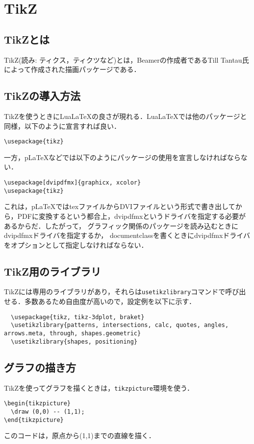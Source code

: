 \section{TikZ}
\subsection{TikZとは}
TikZ(読み: ティクス，ティクツなど)とは，Beamerの作成者であるTill Tantau氏によって作成された描画パッケージである．
\subsection{TikZの導入方法}
TikZを使うときにLuaLaTeXの良さが現れる．LuaLaTeXでは他のパッケージと同様，以下のように宣言すれば良い．
\begin{lstlisting}
\usepackage{tikz}
\end{lstlisting}
一方，pLaTeXなどでは以下のようにパッケージの使用を宣言しなければならない．
\begin{lstlisting}
\usepackage[dvipdfmx]{graphicx, xcolor}
\usepackage{tikz}
\end{lstlisting}
これは，pLaTeXではtexファイルからDVIファイルという形式で書き出してから，PDFに変換するという都合上，dvipdfmxというドライバを指定する必要があるからだ．したがって，
グラフィック関係のパッケージを読み込むときにdvipdfmxドライバを指定するか，
documentclassを書くときにdvipdfmxドライバをオプションとして指定しなければならない．
\subsection{TikZ用のライブラリ}
TikZには専用のライブラリがあり，それらは\texttt{usetikzlibrary}コマンドで呼び出せる．多数あるため自由度が高いので，設定例を以下に示す．
\begin{lstlisting}
  \usepackage{tikz, tikz-3dplot, braket}
  \usetikzlibrary{patterns, intersections, calc, quotes, angles, arrows.meta, through, shapes.geometric}
  \usetikzlibrary{shapes, positioning}
\end{lstlisting}
\subsection{グラフの描き方}
TikZを使ってグラフを描くときは，\texttt{tikzpicture}環境を使う．
\begin{lstlisting}
\begin{tikzpicture}
  \draw (0,0) -- (1,1);
\end{tikzpicture}
\end{lstlisting}
このコードは，原点から(1,1)までの直線を描く．
